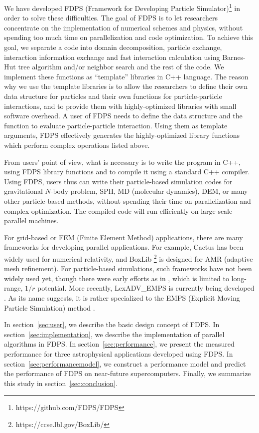 We have developed FDPS (Framework for Developing Particle
Simulator)\footnote{https://github.com/FDPS/FDPS} \citep{2015FDPS} in
order to solve these difficulties. The goal of FDPS is to let
researchers concentrate on the implementation of numerical schemes and
physics, without spending too much time on parallelization and code
optimization. To achieve this goal, we separate a code into domain
decomposition, particle exchange, interaction information exchange and
fast interaction calculation using Barnes-Hut tree algorithm and/or
neighbor search and the rest of the code. We implement these functions
as ``template'' libraries in C++ language. The reason why we use the
template libraries is to allow the researchers to define their own
data structure for particles and their own functions for
particle-particle interactions, and to provide them with
highly-optimized libraries with small software overhead.  A user of
FDPS needs to define the data structure and the function to evaluate
particle-particle interaction. Using them as template arguments, FDPS
effectively generates the highly-optimized library functions which
perform complex operations listed above.

From users' point of view, what is necessary is to write the program
in C++, using FDPS library functions and to compile it using a
standard C++ compiler. Using FDPS, users thus can write their
particle-based simulation codes for gravitational $N$-body problem,
SPH, MD (molecular dynamics), DEM, or many other particle-based
methods, without spending their time on parallelization and complex
optimization. The compiled code will run efficiently on large-scale
parallel machines.

For grid-based or FEM (Finite Element Method) applications, there are
many frameworks for developing parallel applications. For example,
Cactus \citep{2003Cactus} has been widely used for numerical
relativity, and BoxLib \footnote{https://ccse.lbl.gov/BoxLib/} is
designed for AMR (adaptive mesh refinement). For particle-based
simulations, such frameworks have not been widely used yet, though
there were early efforts as in \citet{1995CoPhC..87..266W}, which is
limited to long-range, $1/r$ potential. More recently, LexADV\_EMPS is
currently being developed \citep{2015LexADV_EMPS}. As its name
suggests, it is rather specialized to the EMPS (Explicit Moving
Particle Simulation) method \citep{2014Murotani}.




In section~\ref{sec:user}, we describe the basic design concept of
FDPS.  In section~\ref{sec:implementation}, we describe the
implementation of parallel algorithms in FDPS. In
section~\ref{sec:performance}, we present the measured performance for
three astrophysical applications developed using FDPS. In
section~\ref{sec:performancemodel}, we construct a performance model
and predict the performance of FDPS on near-future supercomputers.
Finally, we summarize this study in section~\ref{sec:conclusion}.

